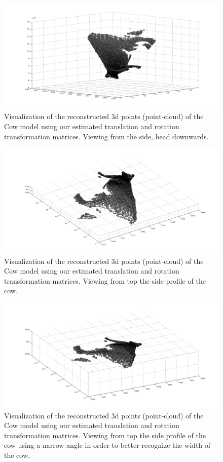 \documentclass{paper}
\begin{document}
\begin{figure}[H]
\centering
\includegraphics[width=\textwidth]{figures/rec_esti_2}
\caption{Visualization of the reconstructed 3d points (point-cloud) of the Cow model using our estimated translation and rotation transformation matrices. Viewing from the side, head downwards.}
\label{fig:cow_rec_us_2}
\end{figure}

\begin{figure}[H]
\centering
\includegraphics[width=\textwidth]{figures/rec_esti_3}
\caption{Visualization of the reconstructed 3d points (point-cloud) of the Cow model using our estimated translation and rotation transformation matrices. Viewing from top the side profile of the cow.}
\label{fig:cow_rec_us_3}
\end{figure}

\begin{figure}[H]
\centering
\includegraphics[width=\textwidth]{figures/rec_esti_4}
\caption{Visualization of the reconstructed 3d points (point-cloud) of the Cow model using our estimated translation and rotation transformation matrices. Viewing from top the side profile of the cow using a narrow angle in order to better recognize the width of the cow.}
\label{fig:cow_rec_us_4}
\end{figure}
\end{document}
